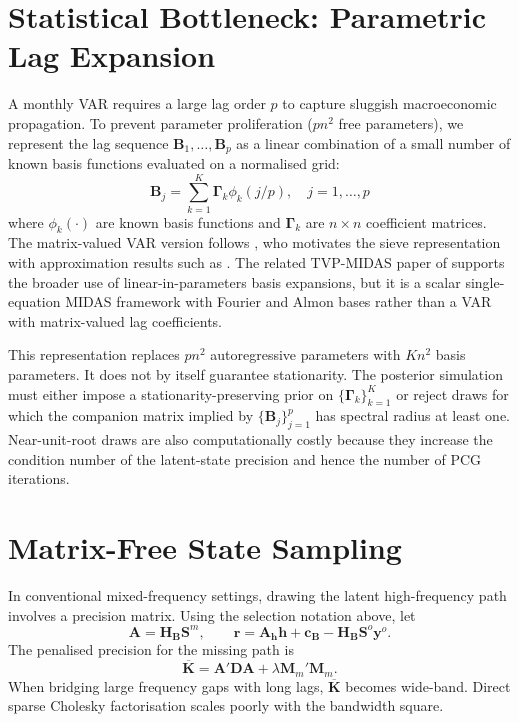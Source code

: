 \documentclass[12pt]{article}
\begin{document}
\section{Statistical Bottleneck: Parametric Lag Expansion}
A monthly VAR requires a large lag order $p$ to capture sluggish macroeconomic propagation. To prevent parameter proliferation ($p n^2$ free parameters), we represent the lag sequence $\mathbf{B}_1, \dots, \mathbf{B}_p$ as a linear combination of a small number of known basis functions evaluated on a normalised grid:
\begin{equation}
    \mathbf{B}_j = \sum_{k=1}^K \mathbf{\Gamma}_k \phi_k(j/p), \quad j = 1, \dots, p
\end{equation}
where $\phi_k(\cdot)$ are known basis functions and $\mathbf{\Gamma}_k$ are $n \times n$ coefficient matrices. The matrix-valued VAR version follows \citet[][Section 3.1]{zhu2026structural}, who motivates the sieve representation with approximation results such as \citet{chen2007large}. The related TVP-MIDAS paper of \citet{chan2025time} supports the broader use of linear-in-parameters basis expansions, but it is a scalar single-equation MIDAS framework with Fourier and Almon bases rather than a VAR with matrix-valued lag coefficients.

This representation replaces $p n^2$ autoregressive parameters with $K n^2$ basis parameters. It does not by itself guarantee stationarity. The posterior simulation must either impose a stationarity-preserving prior on $\{\mathbf{\Gamma}_k\}_{k=1}^K$ or reject draws for which the companion matrix implied by $\{\mathbf{B}_j\}_{j=1}^p$ has spectral radius at least one. Near-unit-root draws are also computationally costly because they increase the condition number of the latent-state precision and hence the number of PCG iterations.

\section{Matrix-Free State Sampling}
In conventional mixed-frequency settings, drawing the latent high-frequency path involves a precision matrix. Using the selection notation above, let
\begin{equation}
    \mathbf{A}=\mathbf{H}_{\mathbf{B}}\mathbf{S}^m,
    \qquad 
    \mathbf{r}=\mathbf{A}_{\mathbf{h}}\mathbf{h}+\mathbf{c}_{\mathbf{B}}-\mathbf{H}_{\mathbf{B}}\mathbf{S}^o\mathbf{y}^o .
\end{equation}
The penalised precision for the missing path is
\begin{equation}
    \overline{\mathbf{K}} = \mathbf{A}'\mathbf{D}\mathbf{A} + \lambda \mathbf{M}_m'\mathbf{M}_m .
\end{equation}
When bridging large frequency gaps with long lags, $\overline{\mathbf{K}}$ becomes wide-band. Direct sparse Cholesky factorisation \citep{chan2009efficient} scales poorly with the bandwidth square.
\end{document}
